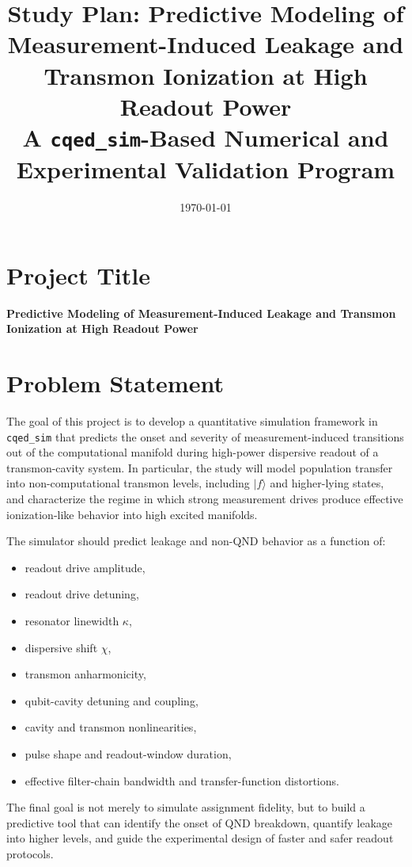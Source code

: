 \documentclass[11pt]{article}
\title{\textbf{Study Plan: Predictive Modeling of Measurement-Induced Leakage and Transmon Ionization at High Readout Power}\\
\vspace{0.3em}
\large A \texttt{cqed\_sim}-Based Numerical and Experimental Validation Program}
\author{}
\date{\today}
\begin{document}
\maketitle

\section{Project Title}

\textbf{Predictive Modeling of Measurement-Induced Leakage and Transmon Ionization at High Readout Power}

\section{Problem Statement}

The goal of this project is to develop a quantitative simulation framework in
\texttt{cqed\_sim} that predicts the onset and severity of measurement-induced transitions
out of the computational manifold during high-power dispersive readout of a transmon-cavity
system. In particular, the study will model population transfer into non-computational
transmon levels, including $|f\rangle$ and higher-lying states, and characterize the
regime in which strong measurement drives produce effective ionization-like behavior into
high excited manifolds.

The simulator should predict leakage and non-QND behavior as a function of:
\begin{itemize}[leftmargin=2em]
    \item readout drive amplitude,
    \item readout drive detuning,
    \item resonator linewidth $\kappa$,
    \item dispersive shift $\chi$,
    \item transmon anharmonicity,
    \item qubit-cavity detuning and coupling,
    \item cavity and transmon nonlinearities,
    \item pulse shape and readout-window duration,
    \item effective filter-chain bandwidth and transfer-function distortions.
\end{itemize}

The final goal is not merely to simulate assignment fidelity, but to build a predictive
tool that can identify the onset of QND breakdown, quantify leakage into higher levels, and
guide the experimental design of faster and safer readout protocols.
\end{document}
